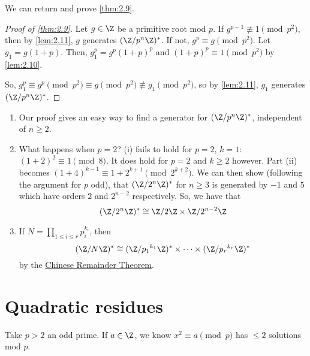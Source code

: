 \documentclass{article}
\begin{document}
We can return and prove \cref{thm:2.9}.

\begin{proof}[Proof of \cref{thm:2.9}\label{pf:2.9}]
    Let $g \in \Z$ be a primitive root mod $p$. If $g^{p-1} \not\equiv 1 \pmod{p^2}$, then by \cref{lem:2.11}, $g$ generates $(\Z/p^n \Z)^*$.
    If not, $g^p \equiv g \pmod{p^2}$. Let $g_1 = g(1 + p)$.
    Then, $g_1^p = g^p (1+p)^p$ and $(1+p)^p \equiv 1 \pmod{p^2}$ by \cref{lem:2.10}.

    So, $g_1^p \equiv g^p \pmod{p^2} \equiv g \pmod{p^2} \not\equiv g_1 \pmod{p^2}$, so by \cref{lem:2.11}, $g_1$ generates $(\Z/p^n \Z)^*$.
\end{proof}

\begin{remark}
    \leavevmode
    \begin{enumerate}
        \item Our proof gives an easy way to find a generator for $(\Z / p^n \Z)^*$, independent of $n \geq 2$.
        \item What happens when $p=2$? (i) fails to hold for $p=2$, $k=1$: $(1+2)^2 \equiv 1 \pmod{8}$.  It does hold for $p=2$ and $k \geq 2$ however. Part (ii) becomes $(1+4)^{k-1} \equiv 1 + 2^{k+1} \pmod{2^{k+2}}$.
            We can then show (following the argument for $p$ odd), that $(\Z/2^n \Z)^*$ for $n \geq 3$ is generated by $-1$ and $5$ which have orders $2$ and $2^{n-2}$ respectively.
            So, we have that
            \begin{equation*}
                (\Z/2^n \Z)^* \cong \Z/2\Z \times \Z/2^{n-2} \Z
            \end{equation*}
        \item If $N = \prod_{1 \leq i \leq r} p_i^{k_i}$, then
            \begin{equation*}
                (\Z/N \Z)^* \cong (\Z/{p_1}^{k_1} \Z)^* \times \dotsm \times (\Z/{p_r}^{k_r} \Z)^*
            \end{equation*}
            by the \hyperlink{thm:crt}{Chinese Remainder Theorem}.
    \end{enumerate}
\end{remark}

\clearpage

\section{Quadratic residues}
Take $p > 2$ an odd prime. If $a \in \Z$, we know $x^2 \equiv a \pmod{p}$ has $\leq 2$ solutions mod $p$.
\end{document}

